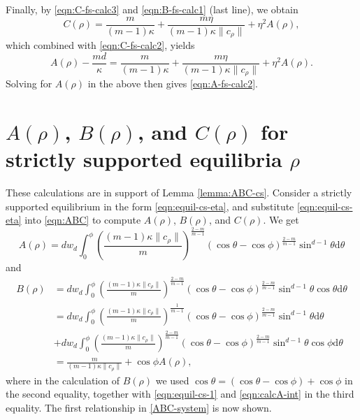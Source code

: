 \documentclass[11pt]{amsart}
\def\d{\mathrm{d}}
\newcommand{\dm}{d} %
\begin{document}
Finally, by \eqref{eqn:C-fs-calc3} and \eqref{eqn:B-fs-calc1} (last line), we obtain
\[
C(\rho)=\frac{m}{(m-1)\kappa}+\frac{m\eta}{(m-1)\kappa \|c_\rho\|}+\eta^2 A(\rho),
\]
which combined with \eqref{eqn:C-fs-calc2}, yields
\begin{equation}
A(\rho)-\frac{m\dm}{\kappa}=\frac{m}{(m-1)\kappa}+\frac{m\eta}{(m-1)\kappa \|c_\rho\|}+\eta^2 A(\rho).
\end{equation}
Solving for $A(\rho)$ in the above then gives \eqref{eqn:A-fs-calc2}.
\smallskip

\section{$A(\rho)$, $B(\rho)$, and $C(\rho)$ for strictly supported equilibria $\rho$}
\label{appendix:ps}

These calculations are in support of Lemma \ref{lemma:ABC-cs}. Consider a strictly supported equilibrium in the form \eqref{eqn:equil-cs-eta}, and substitute \eqref{eqn:equil-cs-eta} into \eqref{eqn:ABC} to compute $A(\rho)$, $B(\rho)$, and $C(\rho)$. We get
\begin{equation}
\label{eqn:calcA-int}
A(\rho)=\dm w_\dm\int_0^\phi\left(\frac{(m-1)\kappa \|c_\rho\|}{m}\right)^{\frac{2-m}{m-1}}\left(\cos\theta-\cos\phi\right)^{\frac{2-m}{m-1}}\sin^{\dm-1}\theta\d\theta
\end{equation}
and
\begin{align*}
B(\rho)&=\dm w_\dm\int_0^\phi\left(\frac{(m-1)\kappa \|c_\rho\|}{m}\right)^{\frac{2-m}{m-1}}\left(\cos\theta-\cos\phi\right)^{\frac{2-m}{m-1}}\sin^{\dm-1}\theta\cos\theta\d\theta\\
&=\dm w_\dm\int_0^\phi\left(\frac{(m-1)\kappa \|c_\rho\|}{m}\right)^{\frac{1}{m-1}}\left(\cos\theta-\cos\phi\right)^{\frac{2-m}{m-1}}\sin^{\dm-1}\theta\d\theta\\
&+\dm w_\dm\int_0^\phi\left(\frac{(m-1)\kappa \|c_\rho\|}{m}\right)^{\frac{2-m}{m-1}}\left(\cos\theta-\cos\phi\right)^{\frac{2-m}{m-1}}\sin^{\dm-1}\theta\cos\phi\d\theta\\
&=\frac{m}{(m-1)\kappa\|c_\rho\|}+\cos\phi A(\rho),
\end{align*}
where in the calculation of $B(\rho)$ we used $\cos\theta=(\cos\theta-\cos\phi)+\cos\phi$ in the second equality, together with \eqref{eqn:equil-cs-1} and \eqref{eqn:calcA-int} in the third equality. The first relationship in \eqref{ABC-system} is now shown.
\end{document}
